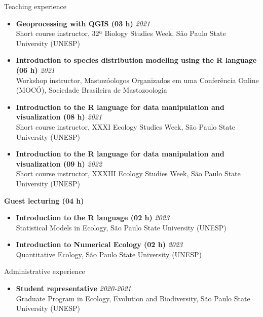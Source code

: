 \documentclass{resume}
\begin{document}
\begin{rSection}{Teaching experience}
\begin{itemize}
\item {\bf Geoprocessing with QGIS (03 h)} \hfill{\em 2021}\\
Short course instructor, 32ª Biology Studies Week, São Paulo State University (UNESP)

\item {\bf Introduction to species distribution modeling using the R language (06 h)} \hfill{\em 2021}\\
Workshop instructor, Mastozóologos Organizados em uma Conferência Online (MOCÓ), Sociedade Brasileira de Mastozoologia

\item {\bf Introduction to the R language for data manipulation and visualization (08 h)} \hfill{\em 2021}\\
Short course instructor, XXXI Ecology Studies Week, São Paulo State University (UNESP)

\item {\bf Introduction to the R language for data manipulation and visualization (09 h)} \hfill{\em 2022}\\
Short course instructor, XXXIII Ecology Studies Week, São Paulo State University (UNESP)
\end{itemize}

{\bf Guest lecturing (04 h)}
\begin{itemize}
\item {\bf Introduction to the R language (02 h)} \hfill{\em 2023}\\
Statistical Models in Ecology, São Paulo State University (UNESP) 

\item {\bf Introduction to Numerical Ecology (02 h)} \hfill{\em 2023}\\
Quantitative Ecology, São Paulo State University (UNESP) 
\end{itemize}
\end{rSection}


\begin{rSection}{Administrative experience}
\begin{itemize}
\item {\bf Student representative} \hfill{\em 2020-2021}\\
Graduate Program in Ecology, Evolution and Biodiversity, São Paulo State University (UNESP)
\end{itemize}
\end{rSection}
\end{document}
